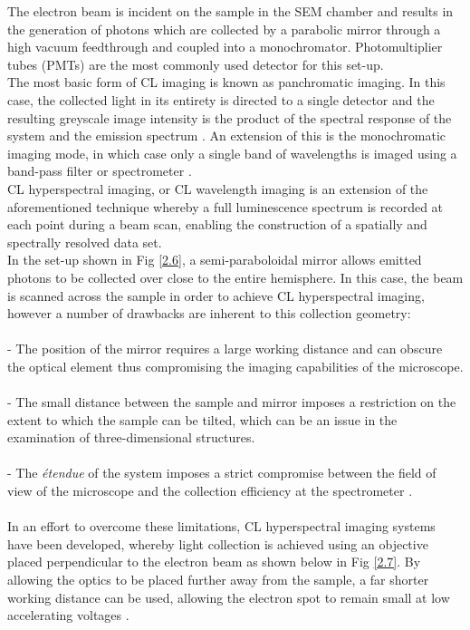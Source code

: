 The electron beam is incident on the sample in the SEM chamber and results in the generation of photons which are collected by a parabolic mirror through a high vacuum feedthrough and coupled into a monochromator. Photomultiplier tubes (PMTs) are the most commonly used detector for this set-up. \\
The most basic form of CL imaging is known as panchromatic imaging. In this case, the collected light in its entirety is directed to a single detector and the resulting greyscale image intensity is the product of the spectral response of the system and the emission spectrum \cite{Edwards2011}. An extension of this is the monochromatic imaging mode, in which case only a single band of wavelengths is imaged using a band-pass filter or spectrometer \cite{Edwards2011}.\\
CL hyperspectral imaging, or CL wavelength imaging is an extension of the aforementioned technique whereby a full luminescence spectrum is recorded at each point during a beam scan, enabling the construction of a spatially and spectrally resolved data set.\\
 In the set-up shown in Fig \ref{2.6}, a semi-paraboloidal mirror allows emitted photons to be collected over close to the entire hemisphere. In this case, the beam is scanned across the sample in order to achieve CL hyperspectral imaging, however a number of drawbacks are inherent to this collection geometry:\\
\\\indent - The position of the mirror requires a large working distance and can obscure the optical element thus compromising the imaging capabilities of the microscope.\\
\\\indent - The small distance between the sample and mirror imposes a restriction on the extent to which the sample can be tilted, which can be an issue in the examination of three-dimensional structures.\\
\\\indent - The {\it\'{e}tendue} of the system imposes a strict compromise between the field of view of the microscope and the collection efficiency at the spectrometer \cite{Edwards2011}.\\
\\\indent In an effort to overcome these limitations, CL hyperspectral imaging systems have been developed, whereby light collection is achieved using an objective placed perpendicular to the electron beam as shown below in Fig \ref{2.7}. By allowing the optics to be placed further away from the sample, a far shorter working distance can be used, allowing the electron spot to remain small at low accelerating voltages \cite{Edwards2011}. 

